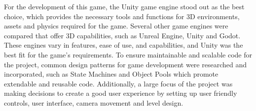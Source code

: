 \documentclass[10pt]{final_report}
\begin{document}
For the development of this game, the Unity game engine stood out as the best choice, which provides the necessary tools and functions for 3D environments, assets and physics required for the game. Several other game engines were compared that offer 3D capabilities, such as Unreal Engine, Unity and Godot. These engines vary in features, ease of use, and capabilities, and Unity was the best fit for the game's requirements. To ensure maintainable and scalable code for the project, common design patterns for game development were researched and incorporated, such as State Machines and Object Pools which promote extendable and reusable code. Additionally, a large focus of the project was making decisions to create a good user experience by setting up user friendly controls, user interface, camera movement and level design. 
\end{document}
